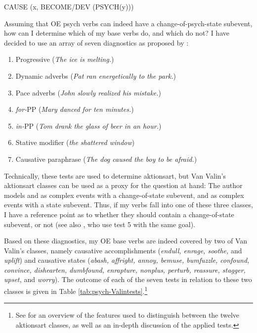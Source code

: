 \begin{exe}
	\ex \label{form:cops} CAUSE (x, BECOME/DEV (PSYCH(y)))
\end{exe} 

\noindent Assuming that OE psych verbs can indeed have a change-of-psych-state subevent, how can I determine which of my base verbs do, and which do not? I have decided to use an array of seven diagnostics as proposed by \citet[35]{VanValin.2005}:

\begin{enumerate} \label{enum:VanDiagnostics}
\item Progressive (\textit{The ice is melting.})
\item Dynamic adverbs (\textit{Pat ran energetically to the park.})
\item Pace adverbs (\textit{John slowly realized his mistake.})
\item \textit{for-}PP (\textit{Mary danced for ten minutes.})
\item \textit{in-}PP (\textit{Tom drank the glass of beer in an hour.})
\item Stative modifier (\textit{the shattered window})
\item Causative paraphrase (\textit{The dog caused the boy to be afraid.})
\end{enumerate}

Technically, these tests are used to determine aktionsart, but Van Valin's aktionsart classes can be used as a proxy for the question at hand: The author models  and  as complex events with a change-of-state subevent, and  as complex events with a state subevent. Thus, if my verbs fall into one of these three classes, I have a reference point as to whether they should contain a change-of-state subevent, or not (see also \citealt{Alexiadou.2014}, who use test 5 with the same goal). 

Based on these diagnostics, my OE base verbs are indeed covered by two of Van Valin's classes, namely causative accomplishments (\textit{endull, enrage, soothe,} and \textit{uplift}) and causative states (\textit{abash, affright, annoy, bemuse, bumfuzzle, confound, convince, dishearten, dumbfound, enrapture, nonplus, perturb, reassure, stagger, upset,} and \textit{worry}). The outcome of each of the seven tests in relation to these two classes is given in Table \ref{tab:psych-Valintests}.\footnote{See \citet[33--39]{VanValin.2005} for an overview of the features used to distinguish between the twelve aktionsart classes, as well as an in-depth discussion of the applied tests.} 

